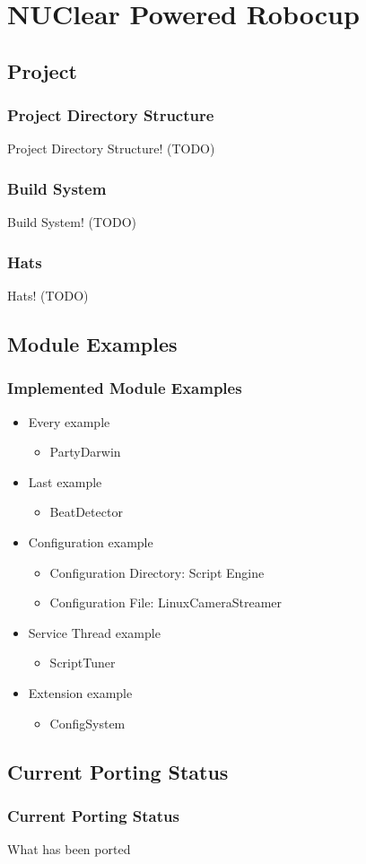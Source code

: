 \documentclass{beamer}
\begin{document}
\section{NUClear Powered Robocup}
\subsection{Project}
\begin{frame}
	\frametitle{Project Directory Structure}
	Project Directory Structure! (TODO)
\end{frame}

\begin{frame}
	\frametitle{Build System}
	Build System! (TODO)
\end{frame}

\begin{frame}
	\frametitle{Hats}
	Hats! (TODO)
\end{frame}

\subsection{Module Examples}
\begin{frame}
	\frametitle{Implemented Module Examples}
	\begin{itemize}
		\item Every example
			\begin{itemize}
				\item PartyDarwin
			\end{itemize}
			
		\item Last example
			\begin{itemize}
				\item BeatDetector
			\end{itemize}
			
		\item Configuration example
			\begin{itemize}
				\item Configuration Directory: Script Engine
				\item Configuration File: LinuxCameraStreamer
			\end{itemize}
			
		\item Service Thread example
			\begin{itemize}
				\item ScriptTuner
			\end{itemize}
			
		\item Extension example
			\begin{itemize}
				\item ConfigSystem
			\end{itemize}
	\end{itemize}
\end{frame}

\subsection{Current Porting Status}
\begin{frame}
	\frametitle{Current Porting Status}
	What has been ported
\end{frame}
\end{document}
